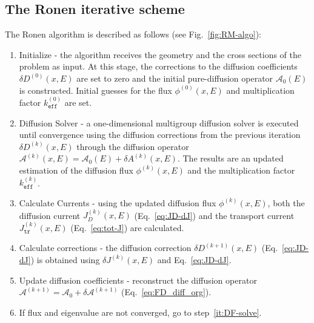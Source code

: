 %
\subsection{The Ronen iterative scheme}
\label{sec:RM-scheme}

The Ronen algorithm is described as follows (see Fig.~\ref{fig:RM-algo}):
\begin{enumerate}
	\item\label{it:init} Initialize - the algorithm receives the geometry and the cross sections of the problem as input. At this stage, the corrections to the diffusion coefficients $\delta D^{(0)}(x,E)$ are set to zero and the initial pure-diffusion operator $\mathcal{A}_0(E)$ is constructed. Initial guesses for the flux $\phi^{(0)}(x,E)$ and multiplication factor $k^{(0)}_\texttt{eff}$ are set.
	\item\label{it:DF-solve} Diffusion Solver - a one-dimensional multigroup diffusion solver is executed until convergence using the diffusion corrections from the previous iteration $\delta D^{(k)}(x,E)$ through the diffusion operator $\mathcal{A}^{(k)}(x,E)=\mathcal{A}_0(E)+\delta A^{(k)}(x,E)$. The results are an updated estimation of the diffusion flux $\phi^{(k)}(x,E)$ and the multiplication factor $k^{(k)}_\texttt{eff}$.
	\item\label{it:Js} Calculate Currents - using the updated diffusion flux $\phi^{(k)}(x,E)$, both the diffusion current $J^{(k)}_D(x,E)$ (Eq.~\ref{eq:JD-dJ}) and the transport current $J^{(k)}_\texttt{tr}(x,E)$ (Eq.~\ref{eq:tot-J}) are calculated.
	\item\label{it:dD} Calculate corrections - the diffusion correction $\delta D^{(k+1)}(x,E)$ (Eq.~\ref{eq:JD-dJ}) is obtained using $\delta J^{(k)}(x,E)$ and Eq.~\eqref{eq:JD-dJ}.
	\item\label{it:dA} Update diffusion coefficients - reconstruct the diffusion operator $\mathcal{A}^{(k+1)} = \mathcal{A}_0+\delta \mathcal{A}^{(k+1)}$ (Eq.~\ref{eq:FD_diff_org}).
	\item\label{it:conv} If flux and eigenvalue are not converged, go to step~\ref{it:DF-solve}.
\end{enumerate}

